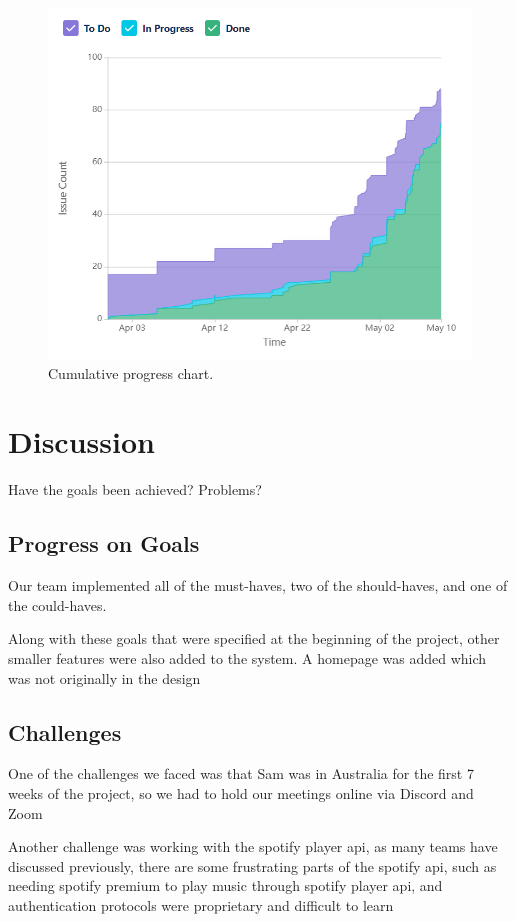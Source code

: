 \documentclass[conference]{IEEEtran}
\begin{document}
\begin{figure}[htbp]
\centerline{\includegraphics[width = \linewidth]{cumulative-flow-diagram.png}}
\caption{Cumulative progress chart.}
\label{fig}
\end{figure}



\section{Discussion}
Have the goals been achieved? Problems?

\subsection{Progress on Goals}
Our team implemented all of the must-haves, two of the should-haves, and one of the could-haves. 

Along with these goals that were specified at the beginning of the project, other smaller features were also added to the system. A homepage was added which was not originally in the design


\subsection{Challenges}
One of the challenges we faced was that Sam was in Australia for the first 7 weeks of the project, so we had to hold our meetings online via Discord and Zoom

Another challenge was working with the spotify player api, as many teams have discussed previously, there are some frustrating parts of the spotify api, such as needing spotify premium to play music through spotify player api, and authentication protocols were proprietary and difficult to learn
\end{document}
